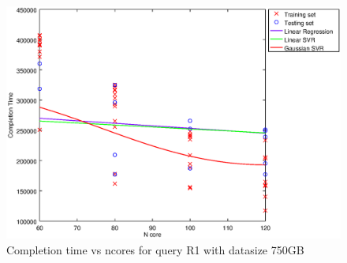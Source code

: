 
\begin {figure}[hbtp]
\centering
\includegraphics[width=\textwidth]{output/R1_750_LINEAR_NCORE/plot_R1_750_bestmodels.eps}
\caption{Completion time vs ncores for query R1 with datasize 750GB}
\label{fig:coreonly_linear_R1_750}
\end {figure}
